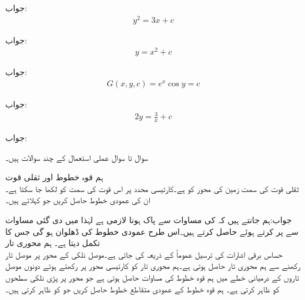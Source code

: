 جواب:
\begin{align*}
y^2=3x+c
\end{align*}

جواب:
\begin{align*}
y=x^2+c
\end{align*}

جواب:
\begin{align*}
G(x,y,c)=e^x \cos y=c
\end{align*}

جواب:
\begin{align*}
2y=\frac{3}{x}+c
\end{align*}

جواب:

سوال  تا سوال  عملی استعمال کے چند سوالات ہیں۔

 \quad ہم قوہ خطوط اور ثقلی قوت\\
ثقلی قوت کی سمت زمین کی محور کو ہے۔کارتیسی محدد پر اس قوت کی سمت کو  لکھا جا سکتا ہے۔ان کی عمودی خطوط حاصل کریں جو  کہلاتے ہیں۔ 

جواب:ہم جانتے ہیں کہ  کی مساوات  سے پاک ہونا لازمی ہے لہٰذا  میں دی گئی مساوات سے  پر کرتے ہوئے  حاصل کرتے ہیں۔اس طرح عمودی خطوط کی ڈھلوان  ہو گی جس کا تکمل  دیتا ہے۔  
ہم محوری تار\\
حساس برقی اشارات کی ترسیل عموماً  کے ذریعہ کی جاتی ہے۔موصل نلکی کے محور پر موصل تار رکھنے سے ہم محوری تار حاصل ہوتی ہے۔ہم محوری تار کو کارتیسی  محور پر رکھتے ہوئے  دونوں موصل تاروں کے درمیانی خطے میں ہم قوہ خطوط کی مساوات  حاصل ہوتی ہے جو  محور پر پڑی نلکی سطحوں کو ظاہر کرتی ہے۔ ہم قوہ خطوط کے عمودی متقاطع خطوط حاصل کریں جو  کو ظاہر کرتی ہیں۔

